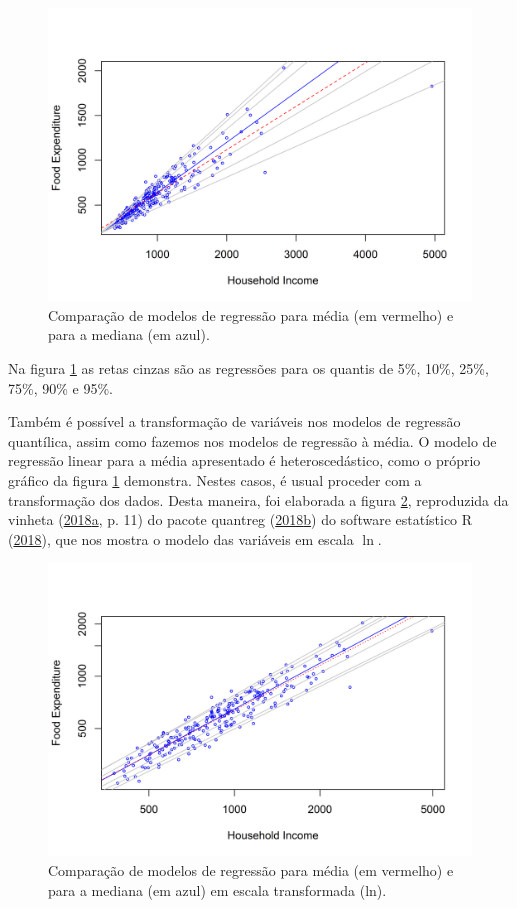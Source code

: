 \documentclass[a4paper, 12pt]{article}
\newcommand{\pkg}[1]{{\normalfont\fontseries{b}\selectfont #1}}
\let\proglang=\textsf
\begin{document}
\begin{figure}[H]

{\centering \includegraphics[width=0.7\linewidth]{images/engel-1} 

}

\caption{Comparação de modelos de regressão para média (em vermelho) e para a mediana (em azul).}\label{fig:engel}
\end{figure}

Na figura \ref{fig:engel} as retas cinzas são as regressões para os
quantis de 5\%, 10\%, 25\%, 75\%, 90\% e 95\%.

Também é possível a transformação de variáveis nos modelos de regressão
quantílica, assim como fazemos nos modelos de regressão à média. O
modelo de regressão linear para a média apresentado é heteroscedástico,
como o próprio gráfico da figura \ref{fig:engel} demonstra. Nestes
casos, é usual proceder com a transformação dos dados. Desta maneira,
foi elaborada a figura \ref{fig:engellog}, reproduzida da vinheta
(\protect\hyperlink{ref-quantregvignette}{2018}\protect\hyperlink{ref-quantregvignette}{a},
p. 11) do pacote \pkg{quantreg}
(\protect\hyperlink{ref-quantreg}{2018}\protect\hyperlink{ref-quantreg}{b})
do software estatístico \proglang{R} (\protect\hyperlink{ref-R}{2018}),
que nos mostra o modelo das variáveis em escala \(\ln\).

\begin{figure}[H]

{\centering \includegraphics[width=0.7\linewidth]{images/engellog-1} 

}

\caption{Comparação de modelos de regressão para média (em vermelho) e para a mediana (em azul) em escala transformada (ln).}\label{fig:engellog}
\end{figure}
\end{document}
